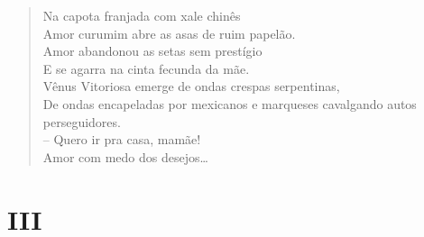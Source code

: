 \begin{verse}
Na capota franjada com xale chinês\\
Amor curumim abre as asas de ruim papelão.\\
Amor abandonou as setas sem prestígio\\
E se agarra na cinta fecunda da mãe.\\
Vênus Vitoriosa emerge de ondas crespas serpentinas,\\
De ondas encapeladas por mexicanos e marqueses cavalgando autos perseguidores.\\
-- Quero ir pra casa, mamãe!\\

Amor com medo dos desejos\ldots{}
\end{verse}

\medskip
\section*{III}

